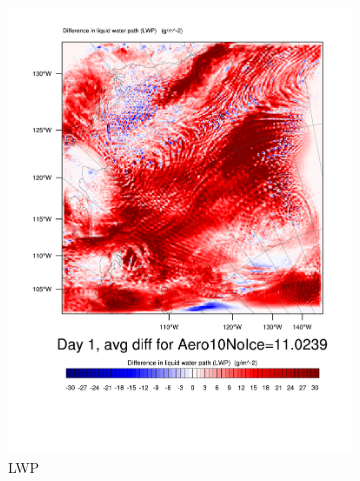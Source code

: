\begin{figure}[hb]
\centering
	\begin{subfigure}{0.48\textwidth}
		\centering
		\includegraphics[width=\textwidth]{results/aero10ni/Diff_LWP_Day1Aero10NoIce.pdf}
		\caption{LWP}
		\label{subfig:LWPr4Day1}
	\end{subfigure}
	\quad
	\begin{subfigure}{0.48\textwidth}
		\centering

\end{subfigure}
\end{figure}
